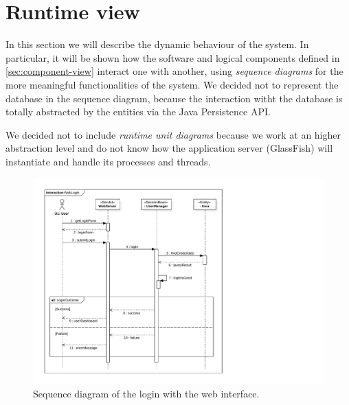 \section{Runtime view}
\label{sec:runtime-view}

In this section we will describe the dynamic behaviour of the system.
In particular, it will be shown how the software and logical components defined in \autoref{sec:component-view} interact one with another, using \emph{sequence diagrams} for the more meaningful functionalities of the system.
We decided not to represent the database in the sequence diagram, because the interaction witht the database is totally abstracted by the entities via the Java Persistence API.

We decided not to include \emph{runtime unit diagrams} because we work at an higher abstraction level and do not know how the application server (GlassFish) will instantiate and handle its processes and threads.

\begin{figure}[h]
    \centering
    \includegraphics[width=\textwidth]{diagrams/sequence_weblogin}
    \caption{Sequence diagram of the login with the web interface.}
    \label{fig:sequence-weblogin}
\end{figure}

